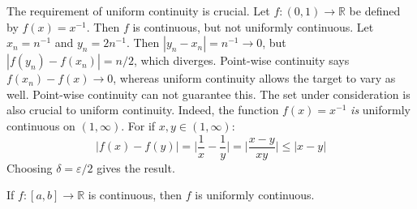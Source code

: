             The requirement of uniform continuity is crucial.
            Let $f:(0,1)\rightarrow\mathbb{R}$ be defined by
            $f(x)=x^{-1}$. Then $f$ is continuous, but
            not uniformly continuous. Let $x_{n}=n^{-1}$
            and $y_{n}=2n^{-1}$. Then
            $|y_{n}-x_{n}|=n^{-1}\rightarrow{0}$, but
            $|f(y_{n})-f(x_{n})|=n/2$, which diverges.
            Point-wise continuity says
            $f(x_{n})-f(x)\rightarrow{0}$, whereas
            uniform continuity allows the target to
            vary as well. Point-wise continuity can
            not guarantee this. The set under consideration is
            also crucial to uniform continuity. Indeed,
            the function $f(x)=x^{-1}$ \textit{is} uniformly
            continuous on $(1,\infty)$. For if $x,y\in(1,\infty)$:
            \begin{equation}
                |f(x)-f(y)|=\Big|\frac{1}{x}-\frac{1}{y}\Big|
                =\Big|\frac{x-y}{xy}\Big|\leq|x-y|
            \end{equation}
            Choosing $\delta=\varepsilon/2$ gives the result.
            \begin{theorem}
                \label{thm:FUNCTIONAL_ANALYSIS:CONT_ON_CLOSED_INTERVAL}
                If $f:[a,b]\rightarrow\mathbb{R}$ is continuous,
                then $f$ is uniformly continuous.
            \end{theorem}
